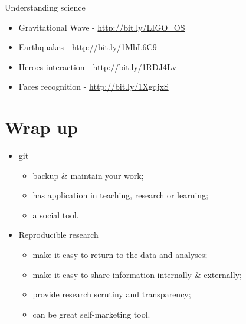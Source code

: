 \documentclass[11pt]{beamer}
\begin{document}
\begin{frame}[fragile]{Understanding science}


\begin{itemize}
	\item Gravitational Wave - \url{http://bit.ly/LIGO_OS}
	\item Earthquakes - \url{http://bit.ly/1MbL6C9}
	\item Heroes interaction - \url{http://bit.ly/1RDJ4Lv}
	\item Faces recognition - \url{http://bit.ly/1XgqjxS}
\end{itemize}

\end{frame}


\section{Wrap up}

\begin{frame}
\begin{itemize}
	\item git
	\begin{itemize}
		\item backup \& maintain your work;
		\item has application in teaching, research or learning;
		\item a social tool.
	\end{itemize}
	\item Reproducible research
	\begin{itemize}
		\item make it easy to return to the data and analyses;
		\item make it easy to share information internally \& externally;
		\item provide research scrutiny and transparency;
		\item can be great self-marketing tool.
	\end{itemize}
\end{itemize}
\end{frame}
\end{document}
